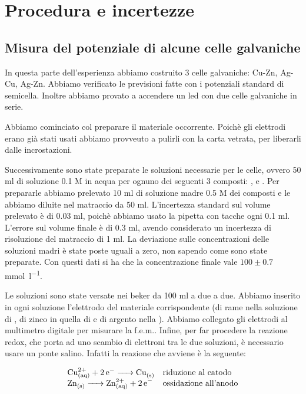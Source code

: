 \section*{Procedura e incertezze}

\subsection*{Misura del potenziale di alcune celle galvaniche}

In questa parte dell'esperienza abbiamo costruito 3 celle galvaniche: Cu-Zn, Ag-Cu, Ag-Zn. Abbiamo verificato
le previsioni fatte con i potenziali standard di semicella. Inoltre abbiamo provato a accendere un led con
due celle galvaniche in serie.

Abbiamo cominciato col preparare il materiale occorrente. Poichè gli elettrodi erano già stati usati abbiamo
provveuto a pulirli con la carta vetrata, per liberarli dalle incrostazioni.

Successivamente sono state preparate le soluzioni necessarie per le celle, ovvero 50 ml di soluzione 0.1 M
in acqua per ognuno dei seguenti 3 composti: ,  e . Per prepararle abbiamo
prelevato 10 ml di soluzione madre 0.5 M dei composti e le abbiamo diluite nel matraccio da 50 ml.
L'incertezza standard sul volume prelevato è di 0.03 ml, poichè abbiamo usato la pipetta con tacche ogni 0.1 ml.
L'errore sul volume finale è di 0.3 ml, avendo considerato un incertezza di risoluzione del matraccio
di 1 ml. La deviazione sulle concentrazioni delle soluzioni madri è state poste uguali a zero, non sapendo come sono
state preparate. Con questi dati si ha che la concentrazione finale vale $100 \pm 0.7$ \si{\milli\mol\per\litre}.

Le soluzioni sono state versate nei beker da 100 ml a due a due. Abbiamo inserito in ogni soluzione l'elettrodo
del materiale corrispondente (di rame nella soluzione di , di zinco in quella di  e di
argento nella ). Abbiamo collegato gli elettrodi al multimetro digitale per misurare la f.e.m..
Infine, per far procedere la reazione redox, che porta ad uno scambio di elettroni tra le due soluzioni,
è necessario usare un ponte salino. Infatti la reazione che avviene è la seguente:

\begin{equation}
    \begin{array}{l l}
        \ce{Cu^{2+}_{(aq)} + 2e- -> Cu_{(s)}} & \text{riduzione al catodo} \\
        \ce{Zn_{(s)} -> Zn^{2+}_{(aq)} + 2e-} & \text{ossidazione all'anodo} \\
    \end{array}
\end{equation}

